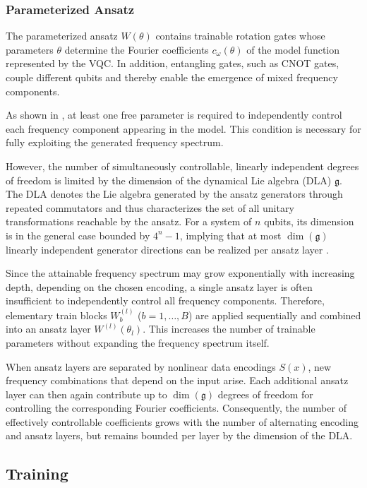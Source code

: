 \subsubsection{Parameterized Ansatz}
\label{sec:bg-vqc-trainable-blocks}

The parameterized ansatz $W(\theta)$ contains trainable rotation gates whose parameters $\theta$ determine the Fourier coefficients $c_\omega(\theta)$ of the model function represented by the VQC. In addition, entangling gates, such as CNOT gates, couple different qubits and thereby enable the emergence of mixed frequency components.

As shown in \cite{schuld2021effect}, at least one free parameter is required to independently control each frequency component appearing in the model. This condition is necessary for fully exploiting the generated frequency spectrum.

However, the number of simultaneously controllable, linearly independent degrees of freedom is limited by the dimension of the dynamical Lie algebra (DLA) $\mathfrak{g}$. The DLA denotes the Lie algebra generated by the ansatz generators through repeated commutators and thus characterizes the set of all unitary transformations reachable by the ansatz. For a system of $n$ qubits, its dimension is in the general case bounded by $4^n - 1$, implying that at most $\dim(\mathfrak{g})$ linearly independent generator directions can be realized per ansatz layer \cite{poppel2025mitigating}.

Since the attainable frequency spectrum may grow exponentially with increasing depth,
depending on the chosen encoding, a single ansatz layer is often insufficient to independently control all frequency components. 
Therefore, elementary train blocks $W^{(l)}_b$ ($b = 1, \dots, B$) are applied sequentially and combined into an ansatz layer $W^{(l)}(\theta_l)$.
This increases the number of trainable parameters without expanding the frequency spectrum itself.

When ansatz layers are separated by nonlinear data encodings $S(x)$,
new frequency combinations that depend on the input arise.
Each additional ansatz layer can then again contribute up to $\dim(\mathfrak{g})$ degrees of freedom for controlling the corresponding Fourier coefficients.
Consequently, the number of effectively controllable coefficients grows with the number of alternating encoding and ansatz layers,
but remains bounded per layer by the dimension of the DLA.


\subsection{Training}
\label{sec:bg-training}

